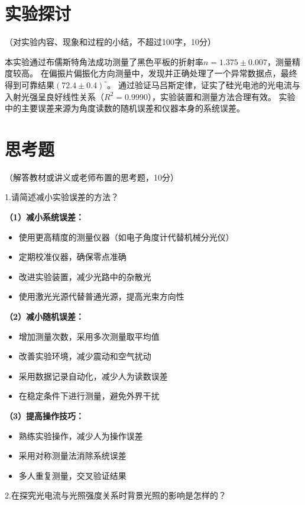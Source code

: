 \documentclass[10pt,a4paper]{ctexart}
\newcommand{\myspace}[1]{\par\vspace{#1\baselineskip}} %
\newcommand{\xiaosi}{\fontsize{12pt}{16pt}\selectfont}
\begin{document}
\section{实验探讨}
\xiaosi（对实验内容、现象和过程的小结，不超过100字，10分）

本实验通过布儒斯特角法成功测量了黑色平板的折射率$n=1.375\pm0.007$，测量精度较高。
在偏振片偏振化方向测量中，发现并正确处理了一个异常数据点，最终得到可靠结果$(72.4\pm0.4)^\circ$。
通过验证马吕斯定律，证实了硅光电池的光电流与入射光强呈良好线性关系（$R^2=0.9990$），实验装置和测量方法合理有效。
实验中的主要误差来源为角度读数的随机误差和仪器本身的系统误差。

\section{思考题}
\xiaosi（解答教材或讲义或老师布置的思考题，10分）

1.请简述减小实验误差的方法？

\textbf{（1）减小系统误差：}
\begin{itemize}
    \item 使用更高精度的测量仪器（如电子角度计代替机械分光仪）
    \item 定期校准仪器，确保零点准确
    \item 改进实验装置，减少光路中的杂散光
    \item 使用激光光源代替普通光源，提高光束方向性
\end{itemize}

\textbf{（2）减小随机误差：}
\begin{itemize}
    \item 增加测量次数，采用多次测量取平均值
    \item 改善实验环境，减少震动和空气扰动
    \item 采用数据记录自动化，减少人为读数误差
    \item 在稳定条件下进行测量，避免外界干扰
\end{itemize}

\textbf{（3）提高操作技巧：}
\begin{itemize}
    \item 熟练实验操作，减少人为操作误差
    \item 采用对称测量法消除系统误差
    \item 多人重复测量，交叉验证结果
\end{itemize}
\myspace{2}
2.在探究光电流与光照强度关系时背景光照的影响是怎样的？
\end{document}
